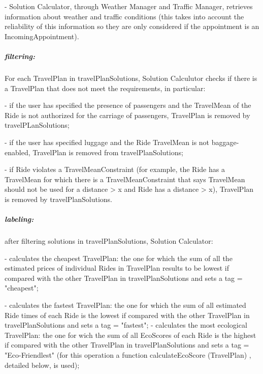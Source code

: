 		- Solution Calculator, through Weather Manager and Traffic Manager, retrieves information about weather and traffic conditions (this takes into account the reliability of this information so they are only considered if the appointment is an IncomingAppointment).
		
	\subparagraph{filtering:}
	 For each TravelPlan in travelPlanSolutions, Solution Calculutor checks if there is a TravelPlan that does not meet the requirements, in particular: \newline
	
	- if the user has specified the presence of passengers and the TravelMean of the Ride is not authorized for the carriage of passengers, TravelPlan is removed by travelPLanSolutions;\newline
	
	- if the user has specified luggage and the Ride TravelMean is not baggage-enabled, TravelPlan is removed from travelPlanSolutions;\newline
	
	- if Ride violates a TravelMeanConstraint (for example, the Ride has a TravelMean for which there is a TravelMeanConstraint that says TravelMean should not be used for a distance > x and Ride has a distance > x), TravelPlan is removed by travelPlanSolutions. \newline
	
	
	
	
	\subparagraph{labeling:}
	after filtering solutions in travelPlanSolutions, Solution Calculator:\newline
	
	- calculates the cheapest  TravelPlan: the one for which the sum of all the estimated prices of individual Rides in TravelPlan results to be lowest if compared with the other TravelPlan in travelPlanSolutions  and sets a tag = "cheapest";\newline
	
	- calculates the fastest TravelPlan: the one for which the sum of all estimated Ride times of each Ride is the lowest if compared with the other TravelPlan in travelPlanSolutions and sets a tag = "fastest"; \newline
	- calculates the most ecological TravelPlan: the one for wich  the sum of all EcoScores of each Ride is  the highest if compared with the other TravelPlan in travelPlanSolutions and sets a tag = "Eco-Friendlest" (for this operation a function calculateEcoScore (TravelPlan) , detailed below, is used);\newline
	
